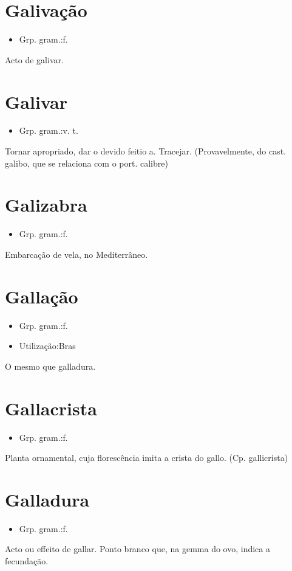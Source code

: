 \section{Galivação}
\begin{itemize}
\item {Grp. gram.:f.}
\end{itemize}
Acto de galivar.
\section{Galivar}
\begin{itemize}
\item {Grp. gram.:v. t.}
\end{itemize}
Tornar apropriado, dar o devido feitio a.
Tracejar.
(Provavelmente, do cast. \textunderscore galibo\textunderscore , que se relaciona com o port. \textunderscore calibre\textunderscore )
\section{Galizabra}
\begin{itemize}
\item {Grp. gram.:f.}
\end{itemize}
Embarcação de vela, no Mediterrâneo.
\section{Gallação}
\begin{itemize}
\item {Grp. gram.:f.}
\end{itemize}
\begin{itemize}
\item {Utilização:Bras}
\end{itemize}
O mesmo que \textunderscore galladura\textunderscore .
\section{Gallacrista}
\begin{itemize}
\item {Grp. gram.:f.}
\end{itemize}
Planta ornamental, cuja florescência imita a crista do gallo.
(Cp. \textunderscore gallicrista\textunderscore )
\section{Galladura}
\begin{itemize}
\item {Grp. gram.:f.}
\end{itemize}
Acto ou effeito de gallar.
Ponto branco que, na gemma do ovo, indica a fecundação.
